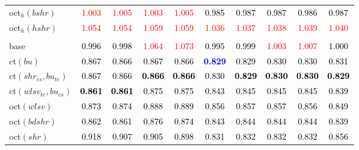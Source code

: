 \begin{tabular}[t]{l|ccccccccc}
oct$_h(bshr)$ & \textcolor{red}{1.003} & \textcolor{red}{1.005} & \textcolor{red}{1.003} & \textcolor{red}{1.005} & \textcolor{black}{0.985} & \textcolor{black}{0.987} & \textcolor{black}{0.987} & \textcolor{black}{0.986} & \textcolor{black}{0.987}\\
oct$_h(hshr)$ & \textcolor{red}{1.054} & \textcolor{red}{1.054} & \textcolor{red}{1.059} & \textcolor{red}{1.059} & \textcolor{red}{1.036} & \textcolor{red}{1.037} & \textcolor{red}{1.038} & \textcolor{red}{1.039} & \textcolor{red}{1.040}\\
\addlinespace[0.3em]
\multicolumn{10}{c}{\textbf{$k = 2$}}\\
base & \textcolor{black}{0.996} & \textcolor{black}{0.998} & \textcolor{red}{1.064} & \textcolor{red}{1.073} & \textcolor{black}{0.995} & \textcolor{black}{0.999} & \textcolor{red}{1.003} & \textcolor{red}{1.007} & \textcolor{black}{1.000}\\
ct$(bu)$ & \textcolor{black}{0.867} & \textcolor{black}{0.866} & \textcolor{black}{0.867} & \textcolor{black}{0.866} & \textcolor{blue}{\textbf{0.829}} & \textcolor{black}{0.829} & \textcolor{black}{0.830} & \textcolor{black}{0.830} & \textcolor{black}{0.831}\\
ct$(shr_{cs}, bu_{te})$ & \textcolor{black}{0.867} & \textcolor{black}{0.866} & \textcolor{black}{\textbf{0.866}} & \textcolor{black}{\textbf{0.866}} & \textcolor{black}{0.830} & \textcolor{black}{\textbf{0.829}} & \textcolor{black}{\textbf{0.830}} & \textcolor{black}{\textbf{0.830}} & \textcolor{black}{\textbf{0.829}}\\
ct$(wlsv_{te}, bu_{cs})$ & \textcolor{black}{\textbf{0.861}} & \textcolor{black}{\textbf{0.861}} & \textcolor{black}{0.875} & \textcolor{black}{0.875} & \textcolor{black}{0.843} & \textcolor{black}{0.845} & \textcolor{black}{0.845} & \textcolor{black}{0.845} & \textcolor{black}{0.839}\\
oct$(wlsv)$ & \textcolor{black}{0.873} & \textcolor{black}{0.874} & \textcolor{black}{0.888} & \textcolor{black}{0.889} & \textcolor{black}{0.856} & \textcolor{black}{0.857} & \textcolor{black}{0.857} & \textcolor{black}{0.856} & \textcolor{black}{0.849}\\
oct$(bdshr)$ & \textcolor{black}{0.862} & \textcolor{black}{0.861} & \textcolor{black}{0.876} & \textcolor{black}{0.874} & \textcolor{black}{0.843} & \textcolor{black}{0.844} & \textcolor{black}{0.844} & \textcolor{black}{0.844} & \textcolor{black}{0.839}\\
oct$(shr)$ & \textcolor{black}{0.918} & \textcolor{black}{0.907} & \textcolor{black}{0.905} & \textcolor{black}{0.898} & \textcolor{black}{0.831} & \textcolor{black}{0.832} & \textcolor{black}{0.832} & \textcolor{black}{0.832} & \textcolor{black}{0.856}\\

\end{tabular}
